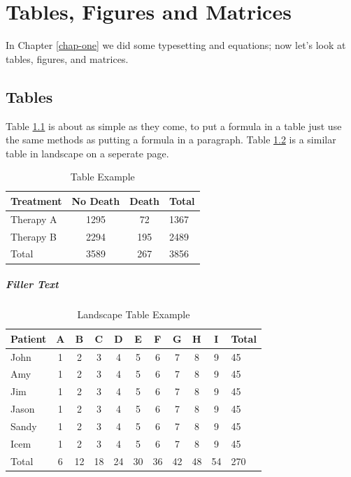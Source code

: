 \chapter{Tables, Figures and Matrices}
\label{chap-two}
In Chapter \ref{chap-one} we did some typesetting and equations; now let's 
look at tables, figures, and matrices.

\section{Tables}
Table \ref{tab:one} is about as simple as they come, to put a formula in a 
table just use the same methods as putting a formula in a paragraph.  
Table \ref{tab:two} is a similar table in landscape on a seperate page.  
%
\begin{table}
\caption{Table Example}
\label{tab:one}
\begin{center}
\begin{tabular}{lccl}
\toprule
Treatment & No Death & Death & Total\\
\midrule
Therapy A & 1295 & 72 & 1367\\
Therapy B 	& 2294 & 195 & 2489\\
\midrule
Total & 3589 & 267 & 3856\\
\bottomrule
\end{tabular}
\end{center}
\end{table}

\paragraph{Filler Text} \lipsum[1-2]

\begin{lscape}
\begin{table}
\caption{Landscape Table Example}
\label{tab:two}
\begin{center}
\begin{tabular}{lcccccccccl}
\toprule
Patient & A & B & C & D & E & F & G & H &I & Total \\
\midrule
John & 1 & 2 & 3 & 4 & 5 & 6 & 7 & 8 & 9 & 45 \\
Amy & 1 & 2 & 3 & 4 & 5 & 6 & 7 & 8 & 9 & 45 \\
Jim & 1 & 2 & 3 & 4 & 5 & 6 & 7 & 8 & 9 & 45 \\
Jason & 1 & 2 & 3 & 4 & 5 & 6 & 7 & 8 & 9 & 45 \\
Sandy & 1 & 2 & 3 & 4 & 5 & 6 & 7 & 8 & 9 & 45 \\
Icem & 1 & 2 & 3 & 4 & 5 & 6 & 7 & 8 & 9 & 45 \\
\midrule
Total & 6 & 12 & 18 & 24 & 30 & 36 & 42 & 48 & 54 & 270\\
\bottomrule
\end{tabular}
\end{center}
\end{table}
\end{lscape}


